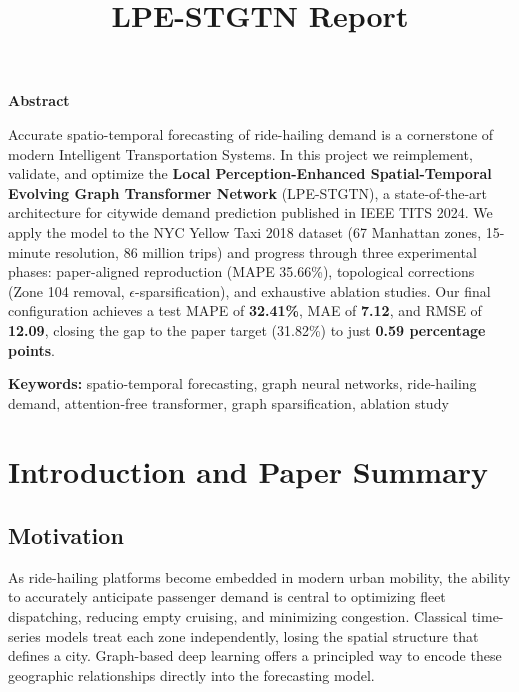 \documentclass{rapportECL}
\title{LPE-STGTN Report}
\begin{document}

\fairemarges
\fairepagedegarde
\tabledematieres

\vspace{1.5em}
\noindent\textbf{\large Abstract}
\vspace{0.5em}

\noindent Accurate spatio-temporal forecasting of ride-hailing demand is a cornerstone of modern Intelligent Transportation Systems. In this project we reimplement, validate, and optimize the \textbf{Local Perception-Enhanced Spatial-Temporal Evolving Graph Transformer Network} (LPE-STGTN), a state-of-the-art architecture for citywide demand prediction published in IEEE TITS 2024. We apply the model to the NYC Yellow Taxi 2018 dataset (67 Manhattan zones, 15-minute resolution, 86 million trips) and progress through three experimental phases: paper-aligned reproduction (MAPE 35.66\%), topological corrections (Zone 104 removal, $\epsilon$-sparsification), and exhaustive ablation studies. Our final configuration achieves a test MAPE of \textbf{32.41\%}, MAE of \textbf{7.12}, and RMSE of \textbf{12.09}, closing the gap to the paper target (31.82\%) to just \textbf{0.59 percentage points}.

\vspace{0.3em}
\noindent\textbf{Keywords:} spatio-temporal forecasting, graph neural networks, ride-hailing demand, attention-free transformer, graph sparsification, ablation study

\section{Introduction and Paper Summary}

\subsection{Motivation}
As ride-hailing platforms become embedded in modern urban mobility, the ability to accurately anticipate passenger demand is central to optimizing fleet dispatching, reducing empty cruising, and minimizing congestion. Classical time-series models treat each zone independently, losing the spatial structure that defines a city. Graph-based deep learning offers a principled way to encode these geographic relationships directly into the forecasting model.
\end{document}

